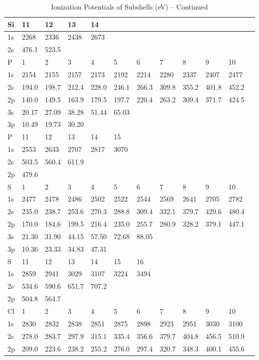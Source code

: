 \begin{table}
\begin{center}
\addtocounter{table}{-1}
\caption{Ionization Potentials of Subshells (eV) -- Continued}
\begin{tabular}{llllllllllll}
\hline
Si&  11&  12&  13&  14\\
\hline
1s&  2268&  2336&  2438&  2673\\
2s& 476.1& 523.5\\
P&    1&   2&   3&
4&   5&   6&   7&   8&   9&  10\\
1s&  2154&  2155&  2157&  2173&  2192&  2214&  2280&  2337&
2407&  2477\\
2s& 194.0& 198.7& 212.4& 228.0& 246.1& 266.3& 309.8& 355.2& 401.8& 452.2\\
2p&
140.0& 149.5& 163.9& 179.5& 197.7& 220.4& 263.2& 309.4& 371.7& 424.5\\
3s& 20.17& 27.09&
38.28& 51.44& 65.03\\3p& 10.49& 19.73& 30.20\\
\hline
P&   11&  12&  13&  14&  15\\
\hline
1s&  2553&  2633&
2707&  2817&  3070\\
2s& 503.5& 560.4& 611.9\\
2p& 479.6\\
\hline
S&    1&   2&   3&   4&   5&   6&
7&  8&   9&  10\\
\hline
1s&  2477&  2478&  2486&  2502&  2522&  2544&  2569&  2641&  2705&  2782\\
2s&
235.0& 238.7& 253.6& 270.3& 288.8& 309.4& 332.1& 379.7& 429.6& 480.4\\
2p& 170.0& 184.6&
199.5& 216.4& 235.0& 255.7& 280.9& 328.2& 379.1& 447.1\\
3s& 21.30& 31.90& 44.15& 57.50&
72.68& 88.05\\
3p& 10.36& 23.33& 34.83& 47.31\\
\hline
S&   11&  12& 13&  14&  15&  16\\
\hline
1s&  2859&
2941&  3029&  3107&  3224&  3494\\
2s& 534.6& 590.6& 651.7& 707.2\\
2p& 504.8& 564.7\\
\hline
Cl&
1&   2&   3&   4&   5&   6&   7&   8&   9&  10\\
\hline
1s&  2830&  2832&  2838&  2851&  2875&  2898&
2923&  2951&  3030&  3100\\
2s& 278.0& 283.7& 297.9& 315.1& 335.4& 356.6& 379.7& 404.8&
456.5& 510.9\\
2p& 209.0& 223.6& 238.2& 255.2& 276.0& 297.4& 320.7& 348.3& 400.1& 455.6\\

\end{tabular}
\end{center}
\end{table}
